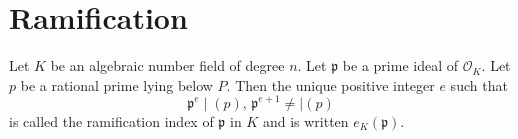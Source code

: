 \documentclass[a4paper]{book}
\theoremstyle{break}
\theoremstyle{plain}
\begin{document}
\newpage

\section{Ramification}

\begin{definition}
    Let \(K\) be an algebraic number field of degree \(n\). Let \(\mathfrak{p}\) be a prime ideal of \(\mathcal{O}_K\). Let \(p\) be a rational prime lying below \(P\). Then the unique positive integer \(e\) such that
    \begin{equation}
        \mathfrak{p}^e \mid (p), \, \mathfrak{p}^{e + 1} \neq\mid (p)
    \end{equation}
    is called the ramification index of \(\mathfrak{p}\) in \(K\) and is written \(e_K(\mathfrak{p})\).
\end{definition}
\end{document}
